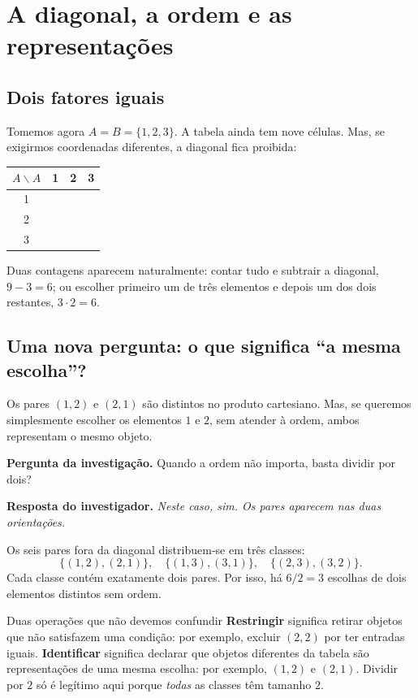 \documentclass[11pt,a4paper,oneside]{book}
\newcommand{\Pergunta}[1]{\begin{perguntabox}\textbf{Pergunta da investigação.} #1\end{perguntabox}}
\newcommand{\Resposta}[1]{\textcolor{verdeescuro}{\textbf{Resposta do investigador.}} \emph{#1}\par}
\newcommand{\ccel}[1]{\cellcolor{green!13}{#1}}
\newcommand{\ecel}[1]{\cellcolor{red!11}{#1}}
\begin{document}
\chapter{A diagonal, a ordem e as representações}
\section{Dois fatores iguais}
Tomemos agora $A=B=\{1,2,3\}$. A tabela ainda tem nove células. Mas, se exigirmos coordenadas diferentes, a diagonal fica proibida:
\begin{center}
\begin{tabular}{c|ccc}
$A\backslash A$&1&2&3\\\hline
1&\ecel{$(1,1)$}&\ccel{$(1,2)$}&\ccel{$(1,3)$}\\
2&\ccel{$(2,1)$}&\ecel{$(2,2)$}&\ccel{$(2,3)$}\\
3&\ccel{$(3,1)$}&\ccel{$(3,2)$}&\ecel{$(3,3)$}
\end{tabular}
\end{center}
Duas contagens aparecem naturalmente: contar tudo e subtrair a diagonal, $9-3=6$; ou escolher primeiro um de três elementos e depois um dos dois restantes, $3\cdot2=6$.

\section{Uma nova pergunta: o que significa ``a mesma escolha''?}
Os pares $(1,2)$ e $(2,1)$ são distintos no produto cartesiano. Mas, se queremos simplesmente escolher os elementos $1$ e $2$, sem atender à ordem, ambos representam o mesmo objeto.
\Pergunta{Quando a ordem não importa, basta dividir por dois?}
\Resposta{Neste caso, sim. Os pares aparecem nas duas orientações.}
Os seis pares fora da diagonal distribuem-se em três classes:
\[
\{(1,2),(2,1)\},\quad
\{(1,3),(3,1)\},\quad
\{(2,3),(3,2)\}.
\]
Cada classe contém exatamente dois pares. Por isso, há $6/2=3$ escolhas de dois elementos distintos sem ordem.
\begin{observacaobox}{Duas operações que não devemos confundir}
\textbf{Restringir} significa retirar objetos que não satisfazem uma condição: por exemplo, excluir $(2,2)$ por ter entradas iguais. \textbf{Identificar} significa declarar que objetos diferentes da tabela são representações de uma mesma escolha: por exemplo, $(1,2)$ e $(2,1)$. Dividir por $2$ só é legítimo aqui porque \emph{todas} as classes têm tamanho $2$.
\end{observacaobox}
\end{document}
